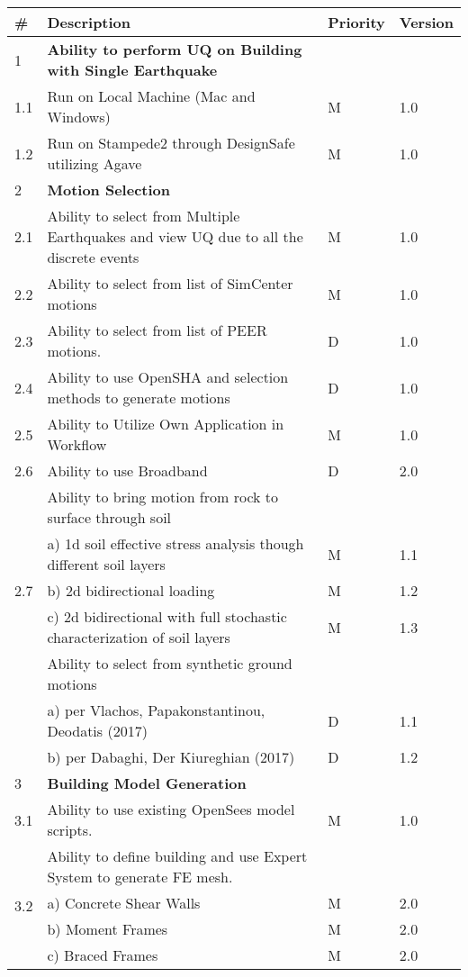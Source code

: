 \begin{table}[hbt!]                 
  \centering
\begin{adjustbox}{max width=\textwidth}            
  \begin{tabular}{llll}                    
    \toprule          
      \# & Description & Priority & Version \\ \hline
    
      1 & \textbf{Ability to perform UQ on Building with Single Earthquake} &  &  \\ 
	1.1 & Run on Local Machine (Mac and Windows) & M & 1.0 \\ \hline
	1.2 & Run on Stampede2 through DesignSafe utilizing Agave & M & 1.0 \\ \hline
	2 & \textbf{Motion Selection} &  &  \\ \hline
	2.1 & Ability to select from Multiple Earthquakes and view UQ due to all the discrete events & M & 1.0  \\ \hline
	2.2 & Ability to select from list of SimCenter motions & M & 1.0 \\ \hline
	2.3 & Ability to select from list of PEER motions. & D & 1.0 \\ \hline
	2.4 & Ability to use OpenSHA and selection methods to generate motions & D & 1.0 \\ \hline
	2.5 & Ability to Utilize Own Application in Workflow & M & 1.0 \\ \hline
	2.6 & Ability to use Broadband & D & 2.0 \\ \hline
	\multirow{5}{*}{2.7} 
	& Ability to bring motion from rock to surface through soil &  &  \\ 
	 & a)     1d soil effective stress analysis though different soil layers & M & 1.1  \\ 
	 & b)     2d bidirectional loading & M & 1.2 \\ 
	 & c)     2d bidirectional with full stochastic characterization of soil layers & M & 1.3 \\ \hline

	\multirow{5}{*}{2.8} 
	& Ability to select from synthetic ground motions &  &  \\ \hline
	 & a)     per Vlachos, Papakonstantinou, Deodatis (2017) & D & 1.1  \\ 
	 & b)     per Dabaghi, Der Kiureghian (2017) & D & 1.2 \\ \hline
	3 & \textbf{Building Model Generation} &  &  \\ \hline
	3.1 & Ability to use existing OpenSees model scripts. & M & 1.0 \\ \hline
	\multirow{5}{*}{3.2}  & Ability to define building and use Expert System to generate FE mesh. &  &  \\
	 & a)     Concrete Shear Walls & M & 2.0 \\ 
	 & b)     Moment Frames & M & 2.0 \\ 
	 & c)     Braced Frames & M & 2.0  \\ \hline
	 

\end{tabular}
\end{adjustbox}
\end{table}
